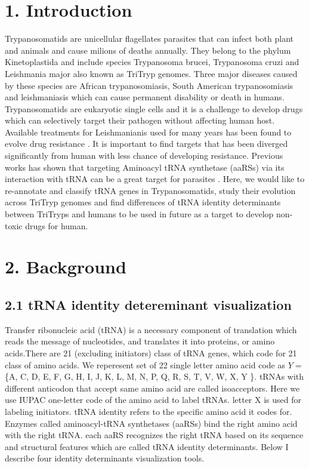 \documentclass[
12pt, %
a4paper, %
oneside, %
headinclude,footinclude, %
BCOR5mm, %
]{scrartcl}
\begin{document}
\section{1. Introduction}
Trypanosomatids are unicellular flagellates parasites that can infect both plant and animals and cause milions of deaths annually. They belong to the phylum Kinetoplastida and include species Trypanosoma brucei, Trypanosoma cruzi and Leishmania major also known as TriTryp genomes. Three major diseases caused by these species are  African trypanosomiasis,  South American trypanosomiasis and leishmaniasis which can cause permanent disability or death in humans. Trypanosomatids are eukaryotic single cells and it is a challenge to develop drugs which can selectively target their pathogen without affecting human host. Available treatments for Leishmanianis used for many years has been found to evolve drug resistance \cite{Resistance1,Resistance2}. It is important to find targets that has been diverged significantly from human with less chance of developing resistance. Previous works has shown that targeting  Aminoacyl tRNA synthetase (aaRSs) via its interaction with tRNA can be a great target for parasites \cite{aaRS}. Here, we would like to re-annotate and classify tRNA genes in Trypanosomatids, study their evolution across TriTryp genomes and find differences of tRNA identity determinants between TriTryps and humans to be used in future as a target to develop non-toxic drugs for human. 


\section{2. Background}

\subsection{\textbf{2.1 tRNA identity detereminant visualization}}
Transfer ribonucleic acid (tRNA) is a necessary component of translation which reads the message of nucleotides, and translates it into proteins, or amino acids.There are 21 (excluding initiators) class of tRNA genes, which code for 21 class of amino acids. We reperesent set of 22 single letter amino acid code as $Y =$ \{A, C, D, E, F, G, H, I, J, K, L, M, N, P, Q, R, S, T, V, W, X, Y \}. tRNAs with different anticodon that accept same amino acid are called isoacceptors. Here we use IUPAC one-letter code of the amino acid to label tRNAs. letter X is used for labeling initiators. tRNA identity refers to the specific amino acid it codes for. Enzymes called aminoacyl-tRNA synthetases (aaRSs) bind the right amino acid with the right tRNA. each aaRS recognizes the right tRNA based on its sequence and structural features which are called tRNA identity determinants. Below I describe four identity determinants visualization tools.
\end{document}
